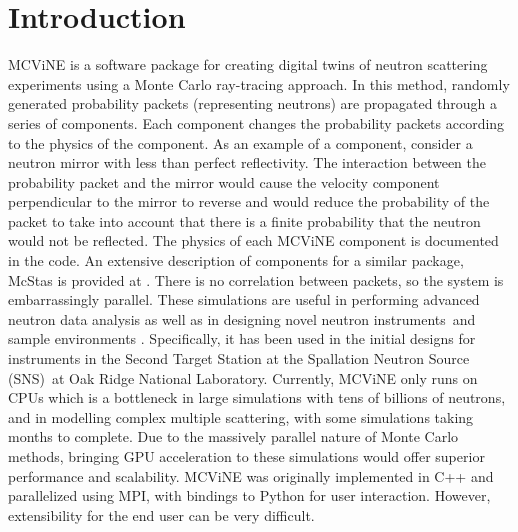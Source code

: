 

\section{Introduction}

MCViNE\cite{lin2016mcvine,Lin_2019} is a software package for creating digital twins of neutron scattering experiments using a Monte Carlo ray-tracing approach. 
In this method, randomly generated probability packets (representing neutrons) are propagated through a series of components. 
Each component changes the probability packets according to the physics of the component.
As an example of a component, consider a neutron mirror with less than perfect reflectivity. The interaction between the probability packet and the mirror would cause the velocity component perpendicular to the mirror to reverse and would reduce the probability of the packet to take into account that there is a finite probability that the neutron would not be reflected. The physics of each MCViNE component is documented in the code.
An extensive description of components for a similar package, McStas is provided at \cite{willendrup_components}.
There is no correlation between packets, so the system is embarrassingly parallel.
These simulations are useful in performing advanced neutron data analysis \cite{lin2022super,islam2019super,sala2022ferrimagnetic,do2022damped,leiner2019frustrated,lin2014UN} as well as in designing novel neutron instruments\,\cite{mamontov2022bwaves,an2022menus,sala2022chess,garlea2022verdi,leighton2022ewald,liu2022pioneer,qian2022centaur,changwoo2022expanse,ankner2023cinematic,hassina2023cupi2d,linjiao2023guide_misalignment} and sample environments \cite{stone2019design,niedziela2017design}. Specifically, it has been used in the initial designs for instruments in the Second Target Station at the Spallation Neutron Source (SNS)\,\cite{mason2006spallation} at Oak Ridge National Laboratory. 
Currently, MCViNE only runs on CPUs which is a bottleneck in large simulations with tens of billions of neutrons, and in modelling complex multiple scattering, with some simulations taking months to complete. Due to the massively parallel nature of Monte Carlo methods, bringing GPU acceleration to these simulations would offer superior performance and scalability. MCViNE was originally implemented in C++ and parallelized using MPI, with bindings to Python for user interaction. 
However, extensibility for the end user can be very difficult.

